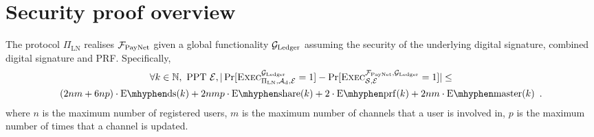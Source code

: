 \section{Security proof overview}
  \begin{theorem}
The protocol $\Pi_{\mathrm{LN}}$ realises $\mathcal{F}_{\mathrm{PayNet}}$
given a global functionality $\mathcal{G}_{\mathrm{Ledger}}$
assuming the security of the underlying digital signature, 
combined digital signature and PRF. Specifically, 
    \label{theorem:simulation}
    \begin{gather*}
      \forall k \in \mathbb{N}, \text{ PPT } \environment, 
      |\Pr[\textsc{Exec}^{\ledger}_{\Pi_{\mathrm{LN}}, \adversary_{\mathrm{d}},
      \environment} = 1] - \Pr[\textsc{Exec}^{\fpaynet, \ledger}_{\simulator,
      \environment} = 1]| \leq \\
      (2nm + 6np) \cdot \mathrm{E \mhyphen ds}(k) +
      2nmp \cdot \mathrm{E \mhyphen share}(k) + 2 \cdot \mathrm{E \mhyphen
      prf}(k) + 2nm \cdot \mathrm{E \mhyphen master}(k) \enspace.
    \end{gather*}
    where $n$ is the maximum number of registered users, 
    $m$ is the maximum number of channels that a user is involved in,
    $p$ is the maximum number of times that a channel is updated. 
  \end{theorem}

